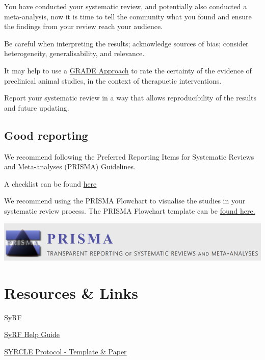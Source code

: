 \documentclass[
]{book}
\begin{document}
You have conducted your systematic review, and potentially also conducted a meta-analysis, now it is time to tell the community what you found and ensure the findings from your review reach your audience.

Be careful when interpreting the results; acknowledge sources of bias; consider heterogeneity, generalisability, and relevance.

It may help to use a \href{https://journals.plos.org/plosone/article?id=10.1371/journal.pone.0187271}{GRADE Approach} to rate the certainty of the evidence of preclinical animal studies, in the context of therapuetic interventions.

Report your systematic review in a way that allows reproducibility of the results and future updating.

\hypertarget{good-reporting}{%
\section{Good reporting}\label{good-reporting}}

We recommend following the Preferred Reporting Items for Systematic Reviews and Meta-analyses (PRISMA) Guidelines.

A checklist can be found \href{http://www.prisma-statement.org/PRISMAStatement/Checklist}{here}

We recommend using the PRISMA Flowchart to visualise the studies in your systematic review process. The PRISMA Flowchart template can be \href{http://prisma-statement.org/prismastatement/flowdiagram}{found here.}

\includegraphics{figs/PRISMA.png}

\hypertarget{resources-links}{%
\chapter{Resources \& Links}\label{resources-links}}

\href{http://syrf.org.uk/}{SyRF}

\href{https://assets.syrf.org.uk/guides/SyRF_User_Guide.pdf}{SyRF Help Guide}

\href{https://onlinelibrary.wiley.com/doi/epdf/10.1002/ebm2.7}{SYRCLE Protocol - Template \& Paper}
\end{document}

